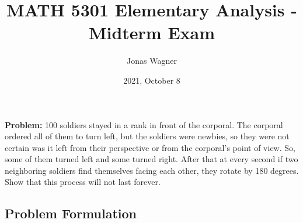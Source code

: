 \documentclass[]{article}
\title{MATH 5301 Elementary Analysis - Midterm Exam}
\author{Jonas Wagner}
\date{2021, October 8}
\begin{document}
\maketitle

\section{}
\textbf{Problem:} 100 soldiers stayed in a rank in front of the corporal. 
The corporal ordered all of them to turn left, but the soldiers were newbies, 
so they were not certain was it left from their perspective or from the corporal’s 
point of view. So, some of them turned left and some turned right. After that 
at every second if two neighboring soldiers find themselves facing each other,
they rotate by 180 degrees. Show that this process will not last forever.

\subsection*{Problem Formulation}
\end{document}
